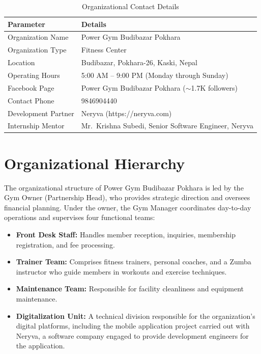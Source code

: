 \begin{table}[htbp]
    \centering
    \caption{Organizational Contact Details}
    \label{tab:org-contact}
    \begin{tabular}{|l|p{3.8in}|}
        \hline
        \textbf{Parameter} & \textbf{Details} \\
        \hline
        Organization Name & Power Gym Budibazar Pokhara \\
        Organization Type & Fitness Center \\
        Location & Budibazar, Pokhara-26, Kaski, Nepal \\
        Operating Hours & 5:00 AM -- 9:00 PM (Monday through Sunday) \\
        Facebook Page & Power Gym Budibazar Pokhara ($\sim$1.7K followers) \\
        Contact Phone & 9846904440 \\
        Development Partner & Neryva (https://neryva.com) \\
        Internship Mentor & Mr.~Krishna Subedi, Senior Software Engineer, Neryva \\
        \hline
    \end{tabular}
\end{table}

\section{Organizational Hierarchy}
The organizational structure of Power Gym Budibazar Pokhara is led by the Gym Owner (Partnership Head), who provides strategic direction and oversees financial planning. Under the owner, the Gym Manager coordinates day-to-day operations and supervises four functional teams:
\begin{itemize}
    \item \textbf{Front Desk Staff:} Handles member reception, inquiries, membership registration, and fee processing.
    \item \textbf{Trainer Team:} Comprises fitness trainers, personal coaches, and a Zumba instructor who guide members in workouts and exercise techniques.
    \item \textbf{Maintenance Team:} Responsible for facility cleanliness and equipment maintenance.
    \item \textbf{Digitalization Unit:} A technical division responsible for the organization's digital platforms, including the mobile application project carried out with Neryva, a software company engaged to provide development engineers for the application.
\end{itemize}

